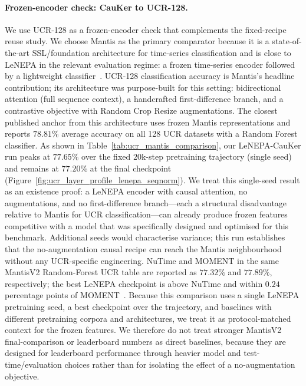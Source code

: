 \documentclass[sigconf,anonymous,review]{acmart}
\begin{document}
\paragraph{Frozen-encoder check: CauKer to UCR-128.}
We use UCR-128 as a frozen-encoder check that complements the fixed-recipe reuse study. We choose Mantis as the primary comparator because it is a state-of-the-art SSL/foundation architecture for time-series classification and is close to LeNEPA in the relevant evaluation regime: a frozen time-series encoder followed by a lightweight classifier~\citep{feofanov2025mantis,feofanov2026mantisv2}.
UCR-128 classification accuracy is Mantis's headline contribution; its architecture was purpose-built for this setting: bidirectional attention (full sequence context), a handcrafted first-difference branch, and a contrastive objective with Random Crop Resize augmentations.
The closest published anchor from this architecture uses frozen Mantis representations and reports $78.81\%$ average accuracy on all 128 UCR datasets with a Random Forest classifier.
As shown in Table~\ref{tab:ucr_mantis_comparison}, our LeNEPA-CauKer run peaks at $77.65\%$ over the fixed $20$k-step pretraining trajectory (single seed) and remains at $77.20\%$ at the final checkpoint (Figure~\ref{fig:ucr_layer_profile_lenepa_seqnorm}).
We treat this single-seed result as an existence proof: a LeNEPA encoder with causal attention, no augmentations, and no first-difference branch---each a structural disadvantage relative to Mantis for UCR classification---can already produce frozen features competitive with a model that was specifically designed and optimised for this benchmark.
Additional seeds would characterise variance; this run establishes that the no-augmentation causal recipe can reach the Mantis neighbourhood without any UCR-specific engineering.
NuTime and MOMENT in the same MantisV2 Random-Forest UCR table are reported as $77.32\%$ and $77.89\%$, respectively; the best LeNEPA checkpoint is above NuTime and within $0.24$ percentage points of MOMENT~\citep{lin2024nutime,goswami2024moment}.
Because this comparison uses a single LeNEPA pretraining seed, a best checkpoint over the trajectory, and baselines with different pretraining corpora and architectures, we treat it as protocol-matched context for the frozen features.
We therefore do not treat stronger MantisV2 final-comparison or leaderboard numbers as direct baselines, because they are designed for leaderboard performance through heavier model and test-time/evaluation choices rather than for isolating the effect of a no-augmentation objective.
\end{document}
